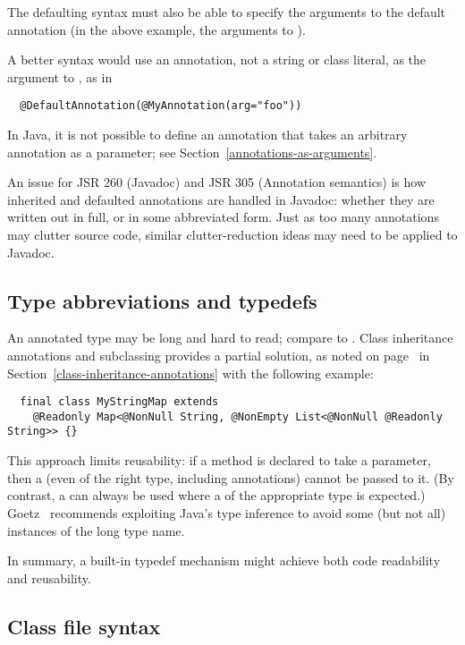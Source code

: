 \documentclass[10pt]{article}
\begin{document}
The defaulting syntax must also be able to specify the arguments to the
default annotation (in the above example, the arguments to ).

A better syntax would use an annotation, not a string or class literal, as the
argument to , as in
\begin{Verbatim}
  @DefaultAnnotation(@MyAnnotation(arg="foo"))
\end{Verbatim}
In Java, it is not possible to define an annotation that takes an
arbitrary annotation as a parameter; see
Section~\ref{annotations-as-arguments}.


An issue for JSR 260 (Javadoc) and JSR 305 (Annotation semantics) is how
inherited and defaulted annotations are handled in Javadoc:  whether they
are written out in full, or in some abbreviated form.  Just as too many
annotations may clutter source code, similar clutter-reduction ideas may
need to be applied to Javadoc.


\subsection{Type abbreviations and typedefs\label{typedef}}

An annotated type may be long and hard to read; compare  to .  Class
inheritance annotations and subclassing provides a partial solution, as
noted
on page~\pageref{class-inheritance-annotations}
in Section~\ref{class-inheritance-annotations} with the following example:

\begin{Verbatim}
  final class MyStringMap extends
    @Readonly Map<@NonNull String, @NonEmpty List<@NonNull @Readonly String>> {}
\end{Verbatim}

This approach limits reusability:  if a method is declared to take a
 parameter, then a  (even of the right type,
including annotations) cannot be passed to it.  (By contrast, a
 can always be used where a  of the appropriate
type is expected.)  Goetz~\cite{Goetz2006} recommends exploiting Java's
type inference to avoid some (but not all) instances of the long type name.

In summary, a built-in typedef mechanism might achieve both code
readability and reusability.


\subsection{Class file syntax}
\end{document}
